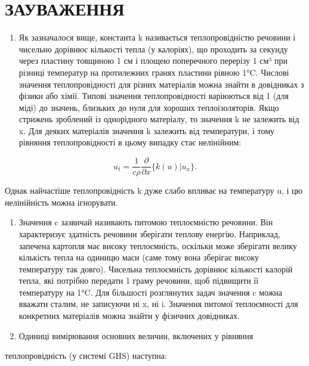 \documentclass[
  ukrainian,
]{article}
\providecommand{\tightlist}{%
  \setlength{\itemsep}{0pt}\setlength{\parskip}{0pt}}
\begin{document}
\section{ЗАУВАЖЕННЯ}\label{ux437ux430ux443ux432ux430ux436ux435ux43dux43dux44f-3}

\begin{enumerate}
\def\labelenumi{\arabic{enumi}.}
\tightlist
\item
  Як зазначалося вище, константа k називається теплопровідністю речовини
  і чисельно дорівнює кількості тепла (у калоріях), що проходить за
  секунду через пластину товщиною 1 см і площею поперечного перерізу 1
  см³ при різниці температур на протилежних гранях пластини рівною 1°C.
  Числові значення теплопровідності для різних матеріалів можна знайти в
  довідниках з фізики або хімії. Типові значення теплопровідності
  варіюються від 1 (для міді) до значень, близьких до нуля для хороших
  теплоізоляторів. Якщо стрижень зроблений із однорідного матеріалу, то
  значення k не залежить від x. Для деяких матеріалів значення k
  залежить від температури, і тому рівняння теплопровідності в цьому
  випадку стає нелінійним:
\end{enumerate}

\[
u_{t} = \frac{1}{c\rho} \frac{\partial}{\partial x} \{ k (u) | u_{x} \}.
\]

Однак найчастіше теплопровідність k дуже слабо впливає на температуру u,
і цю нелінійність можна ігнорувати.

\begin{enumerate}
\def\labelenumi{\arabic{enumi}.}
\setcounter{enumi}{1}
\item
  Значення c зазвичай називають питомою теплоємністю речовини. Він
  характеризує здатність речовини зберігати теплову енергію. Наприклад,
  запечена картопля має високу теплоємність, оскільки може зберігати
  велику кількість тепла на одиницю маси (саме тому вона зберігає високу
  температуру так довго). Чисельна теплоємність дорівнює кількості
  калорій тепла, які потрібно передати 1 граму речовини, щоб підвищити
  її температуру на 1°C. Для більшості розглянутих задач значення c
  можна вважати сталим, не записуючи ні x, ні i. Значення питомої
  теплоємності для конкретних матеріалів можна знайти у фізичних
  довідниках.
\item
  Одиниці вимірювання основних величин, включених у рівняння
\end{enumerate}

теплопровідність (у системі GHS) наступна:
\end{document}
